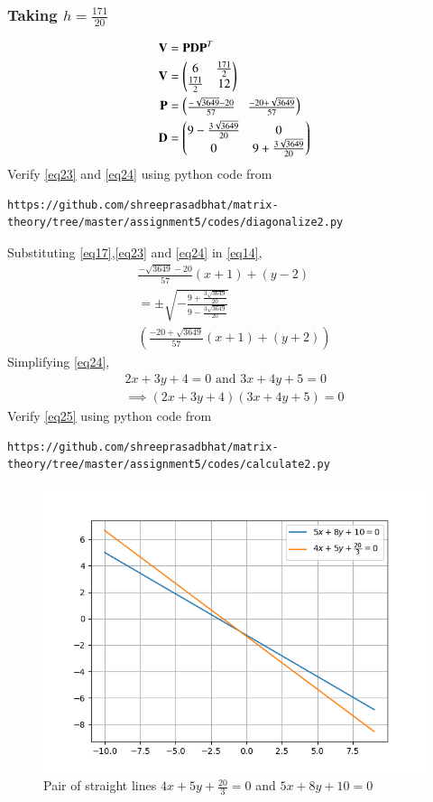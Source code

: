 \documentclass[journal,12pt,twocolumn]{IEEEtran}
\begin{document}
\subsubsection{Taking $h=\frac{171}{20}$}
\begin{align}
	\mathbf{V} &= \mathbf{P}\mathbf{D}\mathbf{P}^T\\
	\mathbf{V} &= \begin{pmatrix} 6 & \frac{171}{2}\\ \frac{171}{2} & 12\end{pmatrix}\\
	\label{eq23}\mathbf{P} &= \begin{pmatrix}\frac{-\sqrt{3649} - 20}{57} & \frac{-20 + \sqrt{3649}}{57}\end{pmatrix}\\
	\label{eq24}\mathbf{D} &= \begin{pmatrix}9 - \frac{3\sqrt{3649}}{20} & 0\\ 0 & 9 + \frac{3\sqrt{3649}}{20}\end{pmatrix}
\end{align}
Verify  \eqref{eq23} and \eqref{eq24} using python code from
\begin{lstlisting}
https://github.com/shreeprasadbhat/matrix-theory/tree/master/assignment5/codes/diagonalize2.py
\end{lstlisting}
Substituting \eqref{eq17},\eqref{eq23} and \eqref{eq24} in \eqref{eq14}, 
\begin{multline}\label{eq25}
	\frac{-\sqrt{3649} - 20}{57}(x+1) + (y-2) \\= \pm 
	\sqrt{-\frac{9 + \frac{3\sqrt{3649}}{20}}{9 - \frac{3\sqrt{3649}}{20}}}\\
	\left(\frac{-20 + \sqrt{3649}}{57}(x+1) + (y+2)\right)
\end{multline}
Simplifying \eqref{eq24},
\begin{align}
	\label{eq26}2x + 3y + 4 = 0 \text{ and } 3x + 4y + 5 = 0\\
	\label{eq27}\implies (2x + 3y + 4)(3x + 4y + 5) = 0
\end{align}
Verify  \eqref{eq25} using python code from
\begin{lstlisting}
https://github.com/shreeprasadbhat/matrix-theory/tree/master/assignment5/codes/calculate2.py
\end{lstlisting}
\renewcommand{\thefigure}{2}
\begin{figure}[h]
	\centering
	\includegraphics[width=\columnwidth]{fig/figure_2.png}
	\caption{Pair of straight lines $4x + 5y + \frac{20}{3} = 0$ and $5x + 8y + 10 = 0$}
	\label{fig:figure2}
\end{figure}
\end{document}
